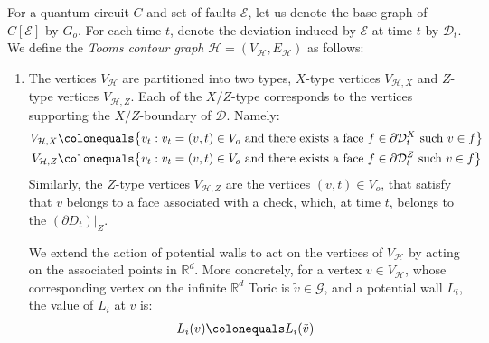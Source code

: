   \begin{definition}
    \label{def:contour}
    For a quantum circuit $C$ and set of faults $\mathcal{E}$, let us denote the base graph of $C[\mathcal{E}]$ by $G_{o}$. For each time $t$, denote the deviation induced by $\mathcal{E}$ at time $t$ by $\mathcal{D}_{t}$. We define the \textit{Tooms contour graph} $\mathcal{H} = ( V_{\mathcal{H}}, E_{\mathcal{H}})$ as follows: 
    \begin{enumerate}
      \item The vertices $V_{\mathcal{H}}$ are partitioned into two types, $X$-type vertices $V_{\mathcal{H},X}$ and $Z$-type vertices $V_{\mathcal{H},Z}$. Each of the $X/Z$-type corresponds to the vertices supporting the $X/Z$-boundary of $\mathcal{D}$. Namely:
        \begin{equation*}
          \begin{split}
            V_{\mathcal{H},X} &\colonequals \big\{ v_{t} : v_{t}=(v,t) \in V_{o} \text{ and there exists a face } f \in \partial \mathcal{D}^{X}_{t} \text{ such } v \in f \big\} \\
            V_{\mathcal{H},Z} &\colonequals \big\{ v_{t} : v_{t}=(v,t) \in V_{o} \text{ and there exists a face } f \in \partial \mathcal{D}^{Z}_{t} \text{ such } v \in f \big\} 
          \end{split}
        \end{equation*}
        Similarly, the $Z$-type vertices $V_{\mathcal{H}, Z}$ are the vertices $(v,t) \in V_{o}$, that satisfy that $v$ belongs to a face associated with a check, which, at time $t$, belongs to the $\left(\partial D_{t} \right)|_{Z}$. 
        

We extend the action of potential walls to act on the vertices of $V_{\mathcal{H}}$ by acting on the associated points in $\mathbb{R}^{d}$. More concretely, for a vertex $v \in V_{\mathcal{H}}$, whose corresponding vertex on the infinite $\mathbb{R}^{d}$ Toric is $\tilde{v} \in \mathcal{G}$, and a potential wall $L_{i}$, the value of $L_{i}$ at $v$ is:
        \begin{equation*}
          \begin{split}
            L_{i}(v) \colonequals L_{i}(\tilde{v})
          \end{split}
        \end{equation*}


\end{enumerate}
\end{definition}
